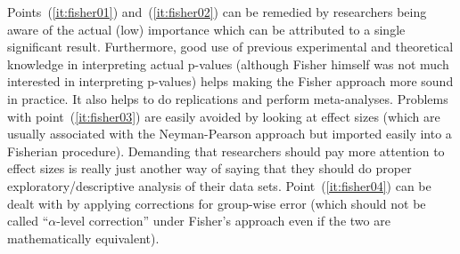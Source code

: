Points~(\ref{it:fisher01}) and~(\ref{it:fisher02}) can be remedied by researchers being aware of the actual (low) importance which can be attributed to a single significant result.
Furthermore, good use of previous experimental and theoretical knowledge in interpreting actual p-values (although Fisher himself was not much interested in interpreting p-values) helps making the Fisher approach more sound in practice.
It also helps to do replications and perform meta-analyses.
Problems with point~(\ref{it:fisher03}) are easily avoided by looking at effect sizes (which are usually associated with the Neyman-Pearson approach but imported easily into a Fisherian procedure).
Demanding that researchers should pay more attention to effect sizes is really just another way of saying that they should do proper exploratory\slash descriptive analysis of their data sets.
Point~(\ref{it:fisher04}) can be dealt with by applying corrections for group-wise error (which should not be called ``$\alpha$-level correction'' under Fisher's approach even if the two are mathematically equivalent).

